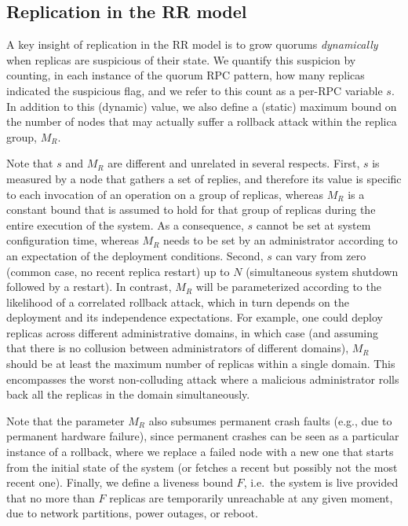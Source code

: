 \subsection{Replication in the \ac{RR} model}

A key insight of replication in the \ac{RR} model is to grow quorums
\emph{dynamically} when replicas are suspicious of their state.
We quantify this suspicion by counting, in each instance of the
quorum RPC pattern, how many replicas indicated the suspicious
flag, and we refer to this count as a per-RPC variable $s$.
In addition to this (dynamic) value, we also define a (static)
maximum bound on the number of nodes that may actually
suffer a rollback attack within the replica group, $M_R$.

Note that $s$ and $M_R$ are different and unrelated in several
respects. First, $s$ is measured by a node that gathers a set of
replies, and therefore its value is specific to each invocation
of an operation on a group of replicas, whereas $M_R$ is a
constant bound that is assumed to hold for that group of replicas
during the entire execution of the system. As a consequence, $s$
cannot be set at system configuration time, whereas $M_R$ needs
to be set by an administrator according to an expectation of the
deployment conditions. Second, $s$ can vary from zero (common
case, no recent replica restart) up to $N$ (simultaneous system
shutdown followed by a restart). In contrast, $M_R$ will be
parameterized according to the likelihood of a correlated
rollback attack, which in turn depends on the deployment and its
independence expectations. For example, one could deploy replicas
across different administrative domains, in which case (and
assuming that there is no collusion between administrators of
different domains), $M_R$ should be at least the maximum number
of replicas within a single domain. This encompasses the worst
non-colluding attack where a malicious administrator rolls back
all the replicas in the domain simultaneously.

Note that the parameter $M_R$ also subsumes permanent crash
faults (e.g., due to permanent hardware failure), since permanent
crashes can be seen as a particular instance of a rollback, where
we replace a failed node with a new one that starts from the
initial state of the system (or fetches a recent but possibly not
the most recent one).
%
Finally, we define a liveness bound $F$, i.e.\ the system is live
provided that no more than $F$ replicas are temporarily unreachable at
any given moment, due to network partitions, power outages, or reboot.

